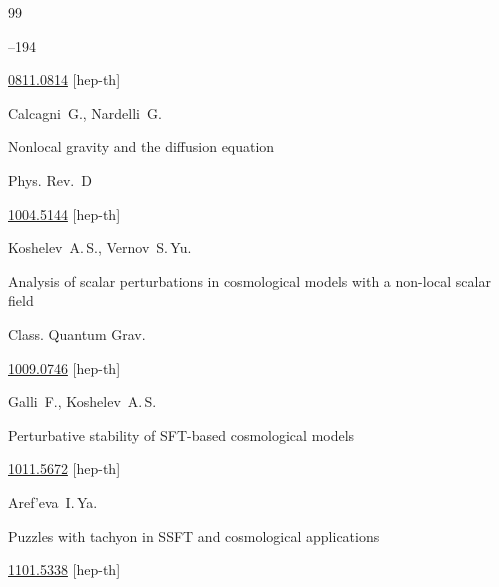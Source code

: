 \begin{thebibliography}{99}


--194


\arxiv \href{http://arxiv.org/abs/0811.0814}{0811.0814} [hep-th]




\by Calcagni~G., Nardelli~G. 

\paper Nonlocal gravity and the diffusion equation

\jour Phys. Rev.~D 






\arxiv \href{http://arxiv.org/abs/1004.5144}{1004.5144} [hep-th]






\by  Koshelev~A.\,S., Vernov~S.\,Yu. 

\paper Analysis of scalar perturbations in cosmological models with a non-local     scalar field




\jour Class. Quantum Grav. 


\arxiv \href{http://arxiv.org/abs/1009.0746}{1009.0746} [hep-th]




\by   Galli~F., Koshelev~A.\,S.

\eprint Perturbative stability of SFT-based cosmological models

\arxiv \href{http://arxiv.org/abs/1011.5672}{1011.5672} [hep-th]




\by Aref'eva~I.\,Ya. 

\eprint Puzzles with tachyon in SSFT and cosmological  applications

\arxiv \href{http://arxiv.org/abs/1101.5338}{1101.5338} [hep-th]





\end{thebibliography}
